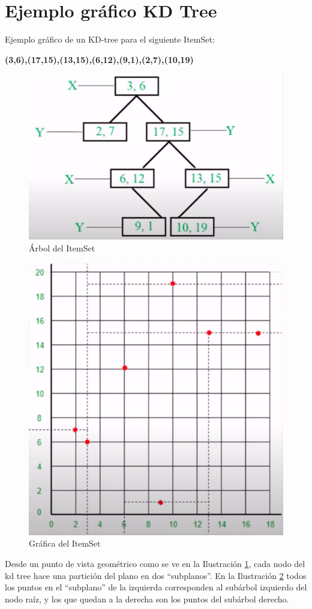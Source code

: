 \documentclass{cosas/tfg_domingo}
\begin{document}
\newpage

\section{Ejemplo gráfico KD Tree}

\hfill

Ejemplo gráfico de un KD-tree para el siguiente ItemSet:

\textbf{{(3,6),(17,15),(13,15),(6,12),(9,1),(2,7),(10,19)}}

\hfill

\begin{figure}[h]
\begin{center}
\includegraphics[width=.4\linewidth]{imagenes/kdtree1.png}
\end{center}
\caption{Árbol del ItemSet}
\label{arbol_kd}
\end{figure}

\begin{figure}[h]
\begin{center}
\includegraphics[width=.4\linewidth]{imagenes/kdtree2.png}
\end{center}
\caption{Gráfica del ItemSet}
\label{grafica_kd}
\end{figure}

Desde un punto de vista geométrico como se ve en la Ilustración \ref{arbol_kd}, cada nodo del kd tree hace una partición del plano en dos “subplanos”. En la Ilustración \ref{grafica_kd} todos los puntos en el “subplano” de la izquierda corresponden al subárbol izquierdo del nodo raíz, y los que quedan a la derecha son los puntos del subárbol derecho.
\end{document}
